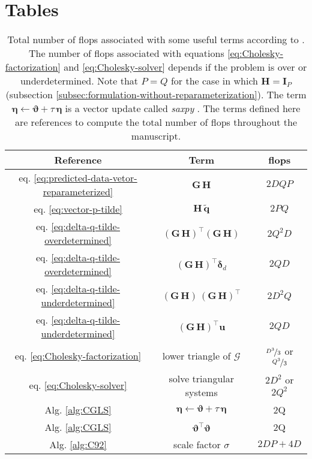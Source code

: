 \section{Tables}

\begin{table}[h!]
	\centering
	\begin{tabular}{c c c}
		Reference & Term & flops \\
		\hline
		eq. \ref{eq:predicted-data-vetor-reparameterized} & $\mathbf{G \, H}$ & $2DQP$ \\
		eq. \ref{eq:vector-p-tilde} & $\mathbf{H} \, \tilde{\mathbf{q}}$ & $2PQ$ \\
		eq. \ref{eq:delta-q-tilde-overdetermined} & $\left(\mathbf{G \, H}\right)^{\top}\left(\mathbf{G \, H}\right)$ & $2Q^{2}D$ \\
		eq. \ref{eq:delta-q-tilde-overdetermined} & $\left(\mathbf{G \, H}\right)^{\top}\boldsymbol{\delta}_{d} $ & $2QD$ \\
		eq. \ref{eq:delta-q-tilde-underdetermined} & $\left(\mathbf{G \, H}\right) \, \left(\mathbf{G \, H}\right)^{\top}$ & $2D^{2}Q$ \\
		eq. \ref{eq:delta-q-tilde-underdetermined} & $\left(\mathbf{G \, H}\right)^{\top}\mathbf{u}$ & $2QD$ \\
		eq. \ref{eq:Cholesky-factorization} & lower triangle of $\boldsymbol{\mathcal{G}}$ & $\nicefrac{D^{3}}{3}$ or $\nicefrac{Q^{3}}{3}$ \\
		eq. \ref{eq:Cholesky-solver} & solve triangular systems & $2D^{2}$ or $2Q^{2}$ \\
		Alg. \ref{alg:CGLS} & $\boldsymbol{\eta} \gets \boldsymbol{\vartheta} + \tau \, \boldsymbol{\eta}$ & 2Q \\
		Alg. \ref{alg:CGLS} & $\boldsymbol{\vartheta}^{\top} \boldsymbol{\vartheta}$ & 2Q \\
		Alg. \ref{alg:C92} & scale factor $\sigma$ & $2DP + 4D$ \\
	\end{tabular}
	\caption{
		Total number of flops associated with some useful terms according to \citet[][p. 12]{golub-vanloan2013}.
		The number of flops associated with equations \ref{eq:Cholesky-factorization} and \ref{eq:Cholesky-solver} 
		depends if the problem is over or underdetermined.
		Note that $P = Q$ for the case in which $\mathbf{H} = \mathbf{I}_{P}$ (subsection \ref{subsec:formulation-without-reparameterization}).
		The term $\boldsymbol{\eta} \gets \boldsymbol{\vartheta} + \tau \, \boldsymbol{\eta}$ is a vector 
		update called \textit{saxpy} \citep[][p. 4]{golub-vanloan2013}.
		The terms defined here are references to compute the total number of flops throughout the manuscript.
	}
	\label{tab:standard-flops}
\end{table}

